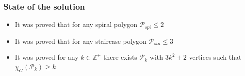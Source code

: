 \documentclass{Assignment}
\begin{document}
\subsubsection*{State of the solution}
\vspace{-0.3cm}
\begin{itemize}
    \itemsep-0.3em
    \item It was proved that for any spiral polygon $\mathcal{P}_{spi} \le 2$
    \item It was proved that for any staircase polygon $\mathcal{P}_{sta} \le 3$
    \item It was proved for any $k \in \mathbb{Z}^{+}$ there exists $ \mathcal{P}_k$ with $3k^2 + 2$ vertices such that $\chi_{G}(\mathcal{P}_k) \ge k$
\end{itemize}
\vspace{-0.8cm}
\end{document}
